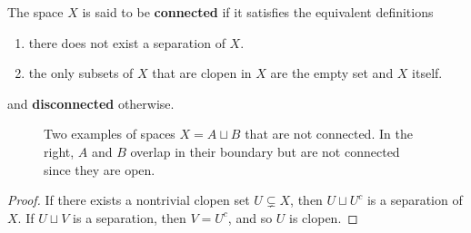   \begin{definition}
    The space $X$ is said to be \textbf{connected} if it satisfies the equivalent definitions 
    \begin{enumerate}
      \item there does not exist a separation of $X$. 
      \item the only subsets of $X$ that are clopen in $X$ are the empty set and $X$ itself. 
    \end{enumerate}
    and \textbf{disconnected} otherwise. 

    \begin{figure}[H]
      \centering 
      \caption{Two examples of spaces $X = A \sqcup B$ that are not connected. In the right, $A$ and $B$ overlap in their boundary but are not connected since they are open. } 
      \label{fig:separation}
    \end{figure}
  \end{definition}
  \begin{proof}
    If there exists a nontrivial clopen set $U \subsetneq X$, then $U \sqcup U^c$ is a separation of $X$. If $U \sqcup V$ is a separation, then $V = U^c$, and so $U$ is clopen. 
  \end{proof} 

